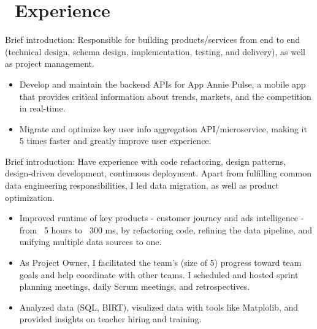 \documentclass{resume}
\begin{document}



\section{\faUsers\ Experience}
\role{Web Backend Engineer}{}
Brief introduction: Responsible for building products/services from end to end (technical design, schema design, implementation, testing, and delivery), as well as project management.
\begin{itemize}
  \item Develop and maintain the backend APIs for App Annie Pulse, a mobile app that provides critical information about trends, markets, and the competition in real-time.
  \item Migrate and optimize key user info aggregation API/microservice, making it 5 times faster and greatly improve user experience.
\end{itemize}

Brief introduction: Have experience with code refactoring, design patterns, design-driven development, continuous deployment. Apart from fulfilling common data engineering responsibilities, I led data migration, as well as product optimization.
\begin{itemize}
  \item Improved runtime of key products - customer journey and ads intelligence - from ~5 hours to ~300 ms, by refactoring code, refining the data pipeline, and unifying multiple data sources to one. 
  \item As Project Owner, I facilitated the team’s (size of 5) progress toward team goals and help coordinate with other teams. I scheduled and hosted sprint planning meetings, daily Scrum meetings, and retrospectives.
\end{itemize}

\begin{itemize}
  \item Analyzed data (SQL, BIRT), visulized data with tools like Matplolib, and provided insights on teacher hiring and training.
\end{itemize}
\end{document}
